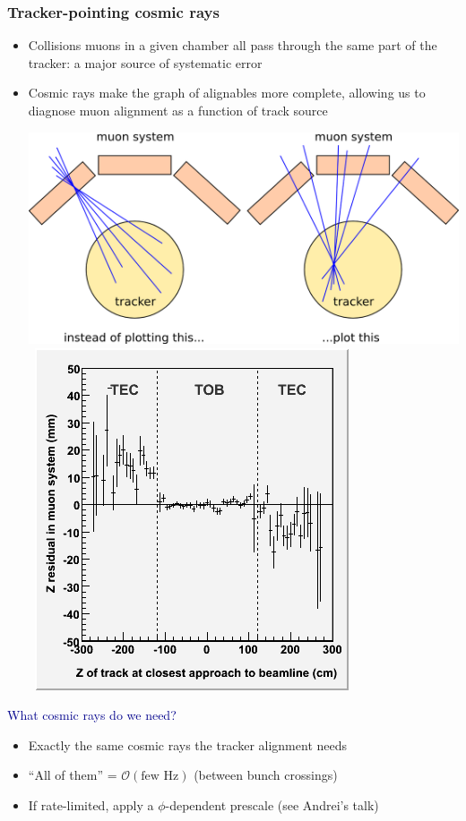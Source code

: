 \documentclass[compress]{beamer}
\begin{document}
\begin{frame}
\frametitle{Tracker-pointing cosmic rays}

\begin{itemize}
\item Collisions muons in a given chamber all pass through the same part of the tracker: a major source of systematic error
\item Cosmic rays make the graph of alignables more complete, allowing us to diagnose muon alignment as a function of track source

\hfill \mbox{\includegraphics[height=3.2 cm]{tracker_xray.png} \hspace{0.3 cm} \includegraphics[height=3.2 cm]{zresid_from_tracker_outerbottom.png}} \hfill
\end{itemize}

\vspace{0.2 cm}
\hspace{-0.83 cm} \textcolor{darkblue}{\Large What cosmic rays do we need?}

\begin{itemize}
\item Exactly the same cosmic rays the tracker alignment needs
\item ``All of them'' = $\mathcal{O}(\mbox{few Hz})$ (between bunch crossings)
\item If rate-limited, apply a $\phi$-dependent prescale (see Andrei's talk)
\end{itemize}
\end{frame}
\end{document}
